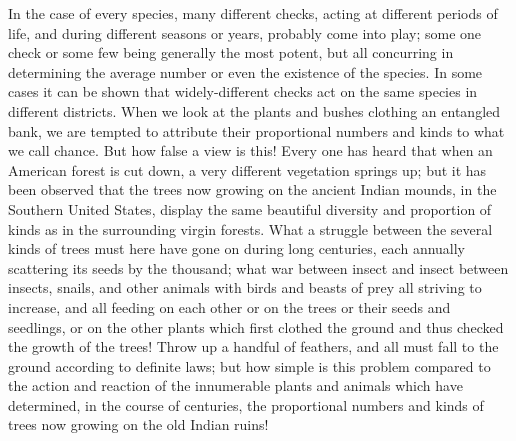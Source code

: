 \indent In the case of every species, many different checks, acting at different periods of life, and during different seasons or years, probably come into play; some one check or some few being generally the most potent, but all concurring in determining the average number or even the existence of the species. In some cases it can be shown that widely-different checks act on the same species in different districts. When we look at the plants and bushes clothing an entangled bank, we are tempted to attribute their proportional numbers and kinds to what we call chance. But how false a view is this! Every one has heard that when an American forest is cut down, a very different vegetation springs up; but it has been observed that the trees now growing on the ancient Indian mounds, in the Southern United States, display the same beautiful diversity and proportion of kinds as in the surrounding virgin forests. What a struggle between the several kinds of trees must here have gone on during long centuries, each annually scattering its seeds by the thousand; what war between insect and insect between insects, snails, and other animals with birds and beasts of prey all striving to increase, and all feeding on each other or on the trees or their seeds and seedlings, or on the other plants which first clothed the ground and thus checked the growth of the trees! Throw up a handful of feathers, and all must fall to the ground according to definite laws; but how simple is this problem compared to the action and reaction of the innumerable plants and animals which have determined, in the course of centuries, the proportional numbers and kinds of trees now growing on the old Indian ruins!\\
